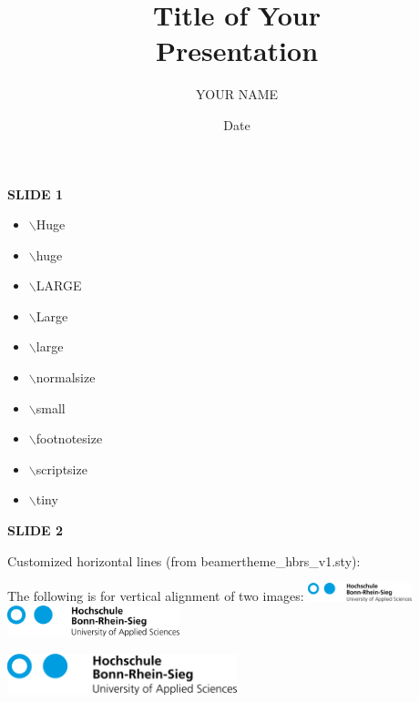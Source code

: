 \documentclass[11pt,vertical]{beamer}
\title{ \textcolor{HBRS}{\Huge\textbf{Title of Your\\ \vspace{1cm} Presentation}} }
\author{YOUR NAME}
\date{Date}
\begin{document}
\frame{\titlepage}

\begin{frame}{\small \textbf{SLIDE 1}}
	
	\begin{itemize}
	    \item \Huge  $\backslash$Huge
	    \item \huge  $\backslash$huge
	    \item \LARGE $\backslash$LARGE
	    \item \Large $\backslash$Large
	    \item \large $\backslash$large
	    \item \normalsize $\backslash$normalsize
	    \item \small $\backslash$small
	    \item \footnotesize $\backslash$footnotesize
	    \item \scriptsize $\backslash$scriptsize
	    \item \tiny $\backslash$tiny
  \end{itemize}

\end{frame}


\begin{frame}{\small \textbf{SLIDE 2}}
	\centering

	Customized horizontal lines (from beamertheme\_hbrs\_v1.sty):
	\lhline
	\mhline
	\shline

	\vfill

	The following is for vertical alignment of two images:
	\lhline
	\includegraphics[valign=m, width=3.0cm]{logo_hbrs}\hspace{1cm}
	\includegraphics[valign=m, width=5.0cm]{logo_hbrs}
	\lhline

	\vfill
	\includegraphics[width=0.5\textwidth]{logo_hbrs}
\end{frame}
\end{document}
